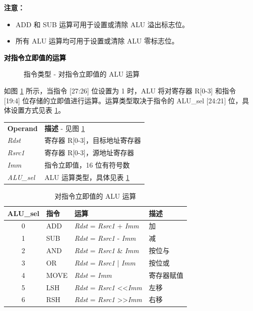 \documentclass[main\_\_CN.tex]{subfiles}
\begin{document}
\newpage
\textbf{注意：}
\begin{itemize}
    \item ADD 和 SUB 运算可用于设置或清除 ALU 溢出标志位。
    \item 所有 ALU 运算均可用于设置或清除 ALU 零标志位。
\end{itemize}

\textcolor{black}{\bfseries 对指令立即值的运算}

%
%
%
%
%
%
%
%
\begin{figure}[!ht]
    \centering
    \caption{指令类型 - 对指令立即值的 ALU 运算}
    \label{figure:ALU-with-immediate-value}
\end{figure}

如图 \ref{figure:ALU-with-immediate-value} 所示，当指令 [27:26] 位设置为 1 时，ALU 将对寄存器 R[0-3] 和指令 [19:4] 位存储的立即值进行运算。运算类型取决于指令的 ALU\_sel [24:21] 位，具体设置方式见表 \ref{table:ALU-with-immediate-value}。

\begin{tabular}{ l l }
\textbf{Operand} & \textbf{描述} - 见图 \ref{figure:ALU-with-immediate-value} \\
\textit{Rdst} & 寄存器 R[0-3]，目标地址寄存器 \\
\textit{Rsrc1} & 寄存器 R[0-3]，源地址寄存器 \\
\textit{Imm} & 指令立即值，16 位有符号数 \\
\textit{ALU\_sel} & ALU 运算类型，具体见表 \ref{table:ALU-with-immediate-value}
\end{tabular}

\begin{table}[!ht]
    \centering
    \begin{tabular}{ c l l l }
    \textbf{ALU\_sel} & \textbf{指令} & \textbf{运算} & \textbf{描述} \\ \hline
    0 & ADD & \textit{Rdst} = \textit{Rsrc1} + \textit{Imm} & 加 \\
    1 & SUB & \textit{Rdst} = \textit{Rsrc1} - \textit{Imm} & 减 \\
    2 & AND & \textit{Rdst} = \textit{Rsrc1} \& \textit{Imm} & 按位与 \\
    3 & OR & \textit{Rdst} = \textit{Rsrc1} | \textit{Imm} & 按位或 \\
    4 & MOVE & \textit{Rdst} = \textit{Imm} & 寄存器赋值 \\
    5 & LSH & \textit{Rdst} = \textit{Rsrc1} \textless\textless\textvisiblespace \textit{Imm} & 左移 \\
    6 & RSH & \textit{Rdst} = \textit{Rsrc1} \textgreater\textgreater\textvisiblespace \textit{Imm} & 右移 \\
    \end{tabular}
    \caption{对指令立即值的 ALU 运算}
    \label{table:ALU-with-immediate-value}
\end{table}
\end{document}
